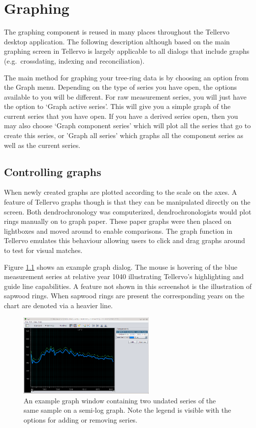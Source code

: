 \chapter{Graphing}

The graphing component is reused in many places throughout the Tellervo desktop application.  The following description although based on the main graphing screen in Tellervo is largely applicable to all dialogs that include graphs (e.g.\ crossdating, indexing and reconciliation).  

The main method for graphing your tree-ring data is by choosing an option from the Graph menu.  Depending on the type of series you have open, the options available to you will be different.  For raw measurement series, you will just have the option to `Graph active series'.  This will give you a simple graph of the current series that you have open.  If you have a derived series open, then you may also choose `Graph component series' which will plot all the series that go to create this series, or 'Graph all series' which graphs all the component series as well as the current series.

\section{Controlling graphs}

When newly created graphs are plotted according to the scale on the axes.  A feature of Tellervo graphs though is that they can be manipulated directly on the screen.  Both dendrochronology was computerized, dendrochronologists would plot rings manually on to graph paper.  These paper graphs were then placed on lightboxes and moved around to enable comparisons.  The graph function in Tellervo emulates this behaviour allowing users to click and drag graphs around to test for visual matches.

Figure \ref{fig:graph} shows an example graph dialog.  The mouse is hovering of the blue measurement series at relative year 1040 illustrating Tellervo's highlighting and guide line capabilities.  A feature not shown in this screenshot is the illustration of sapwood rings.  When sapwood rings are present the corresponding years on the chart are denoted via a heavier line.

\begin{figure}
  \centering
    \includegraphics[width=0.6\textwidth]{Images/graph.png}
    \caption{An example graph window containing two undated series of the same sample on a semi-log graph.  Note the legend is visible with the options for adding or removing series.}
    \label{fig:graph}
\end{figure}


